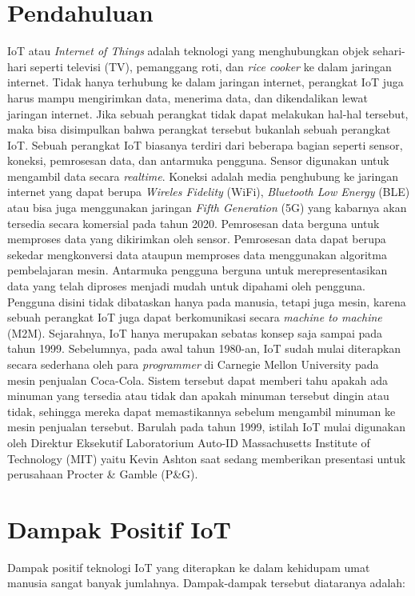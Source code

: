 \documentclass[12pt, letterpaper]{article}
\begin{document}
\section*{Pendahuluan}
IoT atau \textit{Internet of Things} adalah teknologi yang menghubungkan objek sehari-hari seperti televisi (TV), pemanggang roti, dan \textit{rice cooker} ke dalam jaringan internet.\cite{techtarget20} Tidak hanya terhubung ke dalam jaringan internet, perangkat IoT juga harus mampu mengirimkan data, menerima data, dan dikendalikan lewat jaringan internet. Jika sebuah perangkat tidak dapat melakukan hal-hal tersebut, maka bisa disimpulkan bahwa perangkat tersebut bukanlah sebuah perangkat IoT.
\newline
\indent
Sebuah perangkat IoT biasanya terdiri dari beberapa bagian seperti sensor, koneksi, pemrosesan data, dan antarmuka pengguna.\cite{dflair18} Sensor digunakan untuk mengambil data secara \textit{realtime}. Koneksi adalah media penghubung ke jaringan internet yang dapat berupa \textit{Wireles Fidelity} (WiFi), \textit{Bluetooth Low Energy} (BLE) atau bisa juga menggunakan jaringan \textit{Fifth Generation} (5G) yang kabarnya akan tersedia secara komersial pada tahun 2020.\cite{erricson17} Pemrosesan data berguna untuk memproses data yang
dikirimkan oleh sensor. Pemrosesan data dapat berupa sekedar mengkonversi data ataupun memproses data menggunakan algoritma pembelajaran mesin. Antarmuka pengguna berguna untuk merepresentasikan data yang telah diproses menjadi mudah untuk dipahami oleh pengguna. Pengguna disini tidak dibataskan hanya pada manusia, tetapi juga mesin, karena sebuah perangkat IoT juga dapat berkomunikasi secara \textit{machine to machine} (M2M).
\newline
\indent
Sejarahnya, IoT hanya merupakan sebatas konsep saja sampai pada tahun 1999.\cite{dversity16} Sebelumnya, pada awal tahun 1980-an, IoT sudah mulai diterapkan secara sederhana oleh para \textit{programmer} di Carnegie Mellon University pada mesin penjualan Coca-Cola. Sistem tersebut dapat memberi tahu apakah ada minuman yang tersedia atau tidak dan apakah minuman tersebut dingin atau tidak, sehingga mereka dapat memastikannya sebelum mengambil minuman ke mesin penjualan tersebut. Barulah pada tahun 1999, istilah IoT mulai digunakan
oleh Direktur Eksekutif Laboratorium Auto-ID Massachusetts Institute of Technology (MIT) yaitu Kevin Ashton saat sedang memberikan presentasi untuk perusahaan Procter \& Gamble (P\&G).

\newpage
\section{Dampak Positif IoT}
Dampak positif teknologi IoT yang diterapkan ke dalam kehidupam umat manusia sangat banyak jumlahnya. Dampak-dampak tersebut diataranya adalah:
\end{document}
